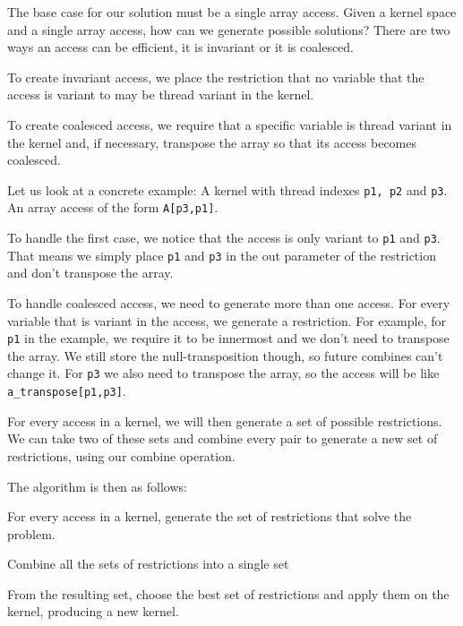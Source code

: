 \documentclass{article}
\begin{document}
The base case for our solution must be a single array access. Given a kernel space and a single array access, how can we generate possible solutions? There are
two ways an access can be efficient, it is invariant or it is coalesced.
\begin{description}
\item To create invariant access, we place the restriction that no variable that the access is variant to may be thread variant in the kernel.
\item To create coalesced access, we require that a specific variable is thread variant in the kernel and, if necessary, transpose the array so that its access
becomes coalesced.
\end{description}

Let us look at a concrete example: A kernel with thread indexes \verb"p1, p2" and \verb"p3". An array access of the form \verb"A[p3,p1]".
\begin{description}
\item To handle the first case, we notice that the access is only variant to \verb|p1| and \verb|p3|. That means we simply place \verb|p1| and \verb|p3| in
  the out parameter of the restriction and don't transpose the array.
\item To handle coalesced access, we need to generate more than one access. For every variable that is variant in the access, we generate a restriction. For
  example, for \verb|p1| in the example, we require it to be innermost and we don't need to transpose the array. We still store the null-transposition though,
  so future combines can't change it. For \verb|p3| we also need to transpose the array, so the access will be like \verb`a_transpose[p1,p3]`.
\end{description}

For every access in a kernel, we will then generate a set of possible restrictions. We can take two of these sets and combine every pair to generate a new set
of restrictions, using our combine operation.

The algorithm is then as follows:
\begin{description}
\item For every access in a kernel, generate the set of restrictions that solve the problem.
\item Combine all the sets of restrictions into a single set
\item From the resulting set, choose the best set of restrictions and apply them on the kernel, producing a new kernel.
\end{description}
\end{document}
